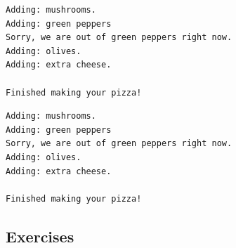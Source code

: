 \documentclass[10pt]{book}
\begin{document}
\label{org4ff9656}
\begin{verbatim}
Adding: mushrooms.
Adding: green peppers
Sorry, we are out of green peppers right now.
Adding: olives.
Adding: extra cheese.

Finished making your pizza!
\end{verbatim}

\label{orgf20745e}
\begin{verbatim}
Adding: mushrooms.
Adding: green peppers
Sorry, we are out of green peppers right now.
Adding: olives.
Adding: extra cheese.

Finished making your pizza!
\end{verbatim}
\subsection{Exercises}
\label{sec:org62a0e60}
\end{document}
